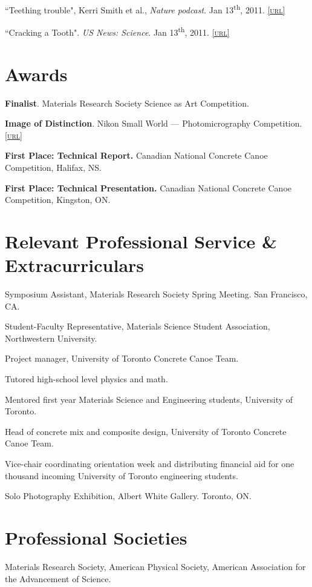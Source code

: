 \begingroup\setlength{\parskip}{0.1cm}
``Teething trouble", Kerri Smith et al., \emph{Nature podcast}. Jan 13\textsuperscript{th}, 2011. \href{http://www.nature.com/nature/podcast/index-2011-01-13.html}{\textsc{\footnotesize{[url]}}}

 ``Cracking a Tooth". \emph{US News: Science}. Jan 13\textsuperscript{th}, 2011. \href{http://www.usnews.com/science/articles/2011/01/13/cracking-a-tooth}{\textsc{\footnotesize{[url]}}}
\endgroup

\section*{Awards}
\textbf{Finalist}. Materials Research Society Science as Art Competition.

\begingroup\setlength{\parskip}{0.1cm}
\textbf{Image of Distinction}. Nikon Small World --- Photomicrography Competition. \href{http://www.nikonsmallworld.com/detail/year/2009/66}{\textsc{\footnotesize{[url]}}}

\textbf{First Place: Technical Report.} Canadian National Concrete Canoe Competition, Halifax, NS.

\textbf{First Place: Technical Presentation.} Canadian National Concrete Canoe Competition, Kingston, ON.
\endgroup

\section*{Relevant Professional Service \& Extracurriculars}
Symposium Assistant, Materials Research Society Spring Meeting. San Francisco, CA.

\begingroup\setlength{\parskip}{0.1cm}
Student-Faculty Representative, Materials Science Student Association, Northwestern University.

Project manager, University of Toronto Concrete Canoe Team.

Tutored high-school level physics and math.

Mentored first year Materials Science and Engineering students, University of Toronto.

Head of concrete mix and composite design, University of Toronto Concrete Canoe Team.

Vice-chair coordinating orientation week and distributing financial aid for one thousand incoming University of Toronto engineering students.

Solo Photography Exhibition, Albert White Gallery. Toronto, ON.
\endgroup

\section*{Professional Societies}
Materials Research Society, American Physical Society, American Association for the Advancement of Science.